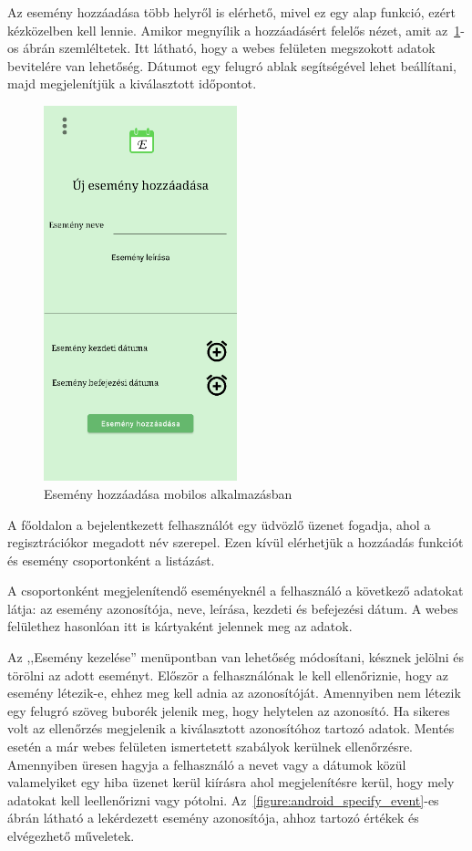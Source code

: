 \documentclass[
]{thesis-ekf}
\theoremstyle{definition}
\theoremstyle{remark}
\begin{document}
	Az esemény hozzáadása több helyről is elérhető, mivel ez egy alap funkció, ezért kézközelben kell lennie. Amikor megnyílik a hozzáadásért felelős nézet, amit az~\ref{figure:androidapp_add_event}-os ábrán szemléltetek. Itt látható, hogy a webes felületen megszokott adatok bevitelére van lehetőség. Dátumot egy felugró ablak segítségével lehet beállítani, majd megjelenítjük a kiválasztott időpontot. 
	
	\begin{figure}[ht!]
		\centering
		\includegraphics[width=0.5\textwidth]{android_app/android_add_event}
		\caption{Esemény hozzáadása mobilos alkalmazásban}
		\label{figure:androidapp_add_event}
	\end{figure}
	
	A főoldalon a bejelentkezett felhasználót egy üdvözlő üzenet fogadja, ahol a regisztrációkor megadott név szerepel. Ezen kívül elérhetjük a hozzáadás funkciót és esemény csoportonként a listázást. 
	
	A csoportonként megjelenítendő eseményeknél a felhasználó a következő adatokat látja: az esemény azonosítója, neve, leírása, kezdeti és befejezési dátum. A webes felülethez hasonlóan itt is kártyaként jelennek meg az adatok. 
	
	Az ,,Esemény kezelése'' menüpontban van lehetőség módosítani, késznek jelölni és törölni az adott eseményt. Először a felhasználónak le kell ellenőriznie, hogy az esemény létezik-e, ehhez meg kell adnia az azonosítóját. Amennyiben nem létezik egy felugró szöveg buborék jelenik meg, hogy helytelen az azonosító. Ha sikeres volt az ellenőrzés megjelenik a kiválasztott azonosítóhoz tartozó adatok. Mentés esetén a már webes felületen ismertetett szabályok kerülnek ellenőrzésre. Amennyiben üresen hagyja a felhasználó a nevet vagy a dátumok közül valamelyiket egy hiba üzenet kerül kiírásra ahol megjelenítésre kerül, hogy mely adatokat kell leellenőrizni vagy pótolni. Az~\ref{figure:android_specify_event}-es ábrán látható a lekérdezett esemény azonosítója, ahhoz tartozó értékek és elvégezhető műveletek. 
	
\end{document}
